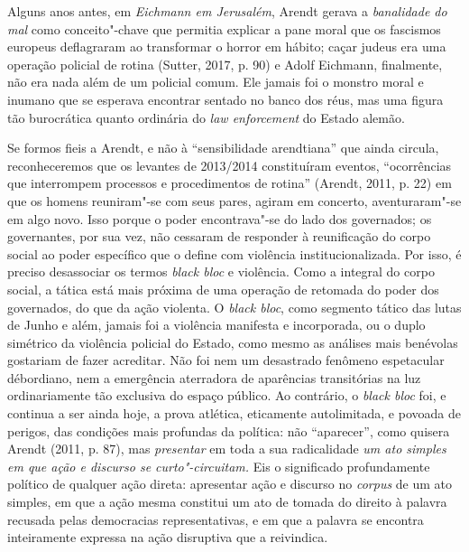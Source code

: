 Alguns anos antes, em \emph{Eichmann em Jerusalém}, Arendt gerava a
\emph{banalidade do mal} como conceito"-chave que permitia explicar a
pane moral que os fascismos europeus deflagraram ao transformar o horror
em hábito; caçar judeus era uma operação policial de rotina (Sutter,
2017, p. 90) e Adolf Eichmann, finalmente, não era nada além de um
policial comum. Ele jamais foi o monstro moral e inumano que se esperava
encontrar sentado no banco dos réus, mas uma figura tão burocrática
quanto ordinária do \emph{law enforcement} do Estado alemão.

Se formos fieis a Arendt, e não à ``sensibilidade arendtiana'' que ainda
circula, reconheceremos que os levantes de 2013/2014 constituíram
eventos, ``ocorrências que interrompem processos e procedimentos de
rotina'' (Arendt, 2011, p. 22) em que os homens reuniram"-se com seus
pares, agiram em concerto, aventuraram"-se em algo novo. Isso porque o
poder encontrava"-se do lado dos governados; os governantes, por sua vez,
não cessaram de responder à reunificação do corpo social ao poder
específico que o define com violência institucionalizada. Por isso, é
preciso desassociar os termos \emph{black bloc} e violência. Como a
integral do corpo social, a tática está mais próxima de uma operação de
retomada do poder dos governados, do que da ação violenta. O \emph{black
bloc}, como segmento tático das lutas de Junho e além, jamais foi a
violência manifesta e incorporada, ou o duplo simétrico da violência
policial do Estado, como mesmo as análises mais benévolas gostariam de
fazer acreditar. Não foi nem um desastrado fenômeno espetacular
débordiano, nem a emergência aterradora de aparências transitórias na
luz ordinariamente tão exclusiva do espaço público. Ao contrário, o
\emph{black bloc} foi, e continua a ser ainda hoje, a prova atlética,
eticamente autolimitada, e povoada de perigos, das condições mais
profundas da política: não ``aparecer'', como quisera Arendt (2011, p.
87), mas \emph{presentar} em toda a sua radicalidade \emph{um ato
simples em que ação e discurso se curto"-circuitam.} Eis o significado
profundamente político de qualquer ação direta: apresentar ação e
discurso no \emph{corpus} de um ato simples, em que a ação mesma
constitui um ato de tomada do direito à palavra recusada pelas
democracias representativas, e em que a palavra se encontra inteiramente
expressa na ação disruptiva que a reivindica.

